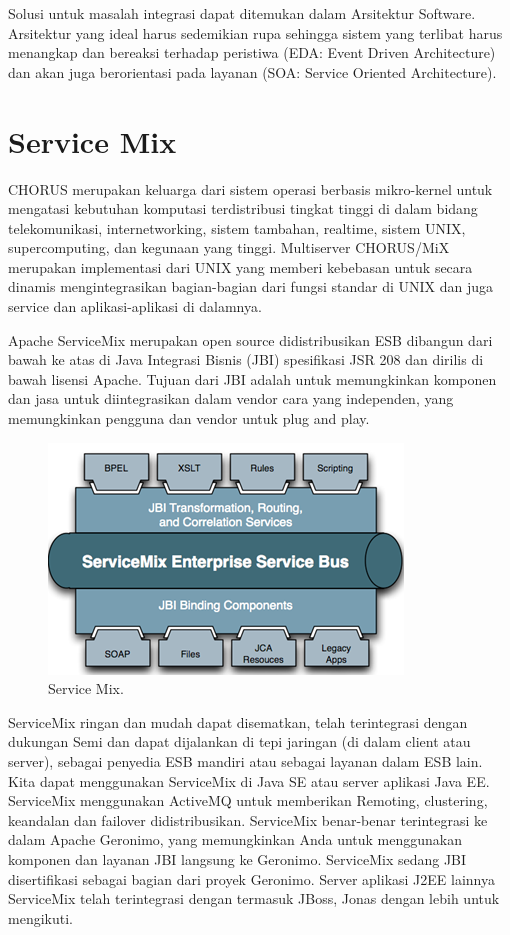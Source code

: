 \documentclass{jtetiproposalskripsi}
\begin{document}
Solusi untuk masalah integrasi dapat ditemukan dalam Arsitektur Software. Arsitektur yang ideal harus sedemikian rupa sehingga sistem yang terlibat harus menangkap dan bereaksi terhadap peristiwa (EDA: Event Driven Architecture) dan akan juga berorientasi pada layanan (SOA: Service Oriented Architecture).

\section{Service Mix}
CHORUS merupakan keluarga dari sistem operasi berbasis mikro-kernel untuk mengatasi kebutuhan komputasi terdistribusi tingkat tinggi di dalam bidang telekomunikasi, internetworking, sistem tambahan, realtime, sistem UNIX, supercomputing, dan kegunaan yang tinggi. Multiserver CHORUS/MiX merupakan implementasi dari UNIX yang memberi kebebasan untuk secara dinamis mengintegrasikan bagian-bagian dari fungsi standar di UNIX dan juga service dan aplikasi-aplikasi di dalamnya.

Apache ServiceMix merupakan open source didistribusikan ESB dibangun dari bawah ke atas di Java Integrasi Bisnis (JBI) spesifikasi JSR 208 dan dirilis di bawah lisensi Apache. Tujuan dari JBI adalah untuk memungkinkan komponen dan jasa untuk diintegrasikan dalam vendor cara yang independen, yang memungkinkan pengguna dan vendor untuk plug and play.
\begin{figure}[ht!]
  \centering
    \includegraphics{gambar/5}
    \caption{Service Mix.}
    \label{wsn}
\end{figure}

ServiceMix ringan dan mudah dapat disematkan, telah terintegrasi dengan dukungan Semi dan dapat dijalankan di tepi jaringan (di dalam client atau server), sebagai penyedia ESB mandiri atau sebagai layanan dalam ESB lain. Kita dapat menggunakan ServiceMix di Java SE atau server aplikasi Java EE. ServiceMix menggunakan ActiveMQ untuk memberikan Remoting, clustering, keandalan dan failover didistribusikan. ServiceMix benar-benar terintegrasi ke dalam Apache Geronimo, yang memungkinkan Anda untuk menggunakan komponen dan layanan JBI langsung ke Geronimo. ServiceMix sedang JBI disertifikasi sebagai bagian dari proyek Geronimo. Server aplikasi J2EE lainnya ServiceMix telah terintegrasi dengan termasuk JBoss, Jonas dengan lebih untuk mengikuti.
\end{document}

